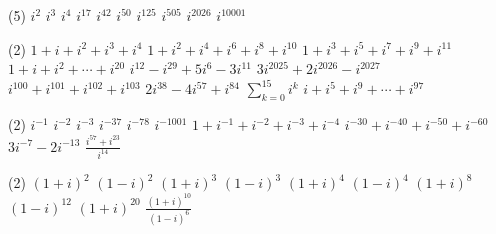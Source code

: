 \documentclass[12pt,a4paper]{article}
\begin{document}
\begin{exercise}[Vypočítejte]
    \begin{tasks}(5)
        \task $i^2$
        \task $i^3$
        \task $i^4$
        \task $i^{17}$
        \task $i^{42}$
        \task $i^{50}$
        \task $i^{125}$
        \task $i^{505}$
        \task $i^{2026}$
        \task $i^{10001}$
    \end{tasks}
\end{exercise}


\begin{exercise}[Vypočítejte]
    \begin{tasks}(2)
        \task $1+i+i^2+i^3+i^4$
        \task $1+i^2+i^4+i^6+i^8+i^{10}$
        \task $1+i^3+i^5+i^7+i^9+i^{11}$
        \task $1+i+i^2+\cdots+i^{20}$
        \task $i^{12}-i^{29}+5i^{6}-3i^{11}$
        \task $3i^{2025}+2i^{2026}-i^{2027}$
        \task $i^{100}+i^{101}+i^{102}+i^{103}$
        \task $2i^{38}-4i^{57}+i^{84}$
        \task $\displaystyle \sum_{k=0}^{15}i^k$
        \task $\displaystyle i+i^5+i^9+\cdots+i^{97}$
    \end{tasks}
\end{exercise}


\begin{exercise}[Vypočítejte]
    \begin{tasks}(2)
        \task $i^{-1}$
        \task $i^{-2}$
        \task $i^{-3}$
        \task $i^{-37}$
        \task $i^{-78}$
        \task $i^{-1001}$
        \task $1+i^{-1}+i^{-2}+i^{-3}+i^{-4}$
        \task $i^{-30}+i^{-40}+i^{-50}+i^{-60}$
        \task $3i^{-7}-2i^{-13}$
        \task $\displaystyle \frac{i^{57}+i^{23}}{i^{14}}$
    \end{tasks}
\end{exercise}


\begin{exercise}[Vypočítejte]
    \begin{tasks}(2)
        \task $(1+i)^2$
        \task $(1-i)^2$
        \task $(1+i)^3$
        \task $(1-i)^3$
        \task $(1+i)^4$
        \task $(1-i)^4$
        \task $(1+i)^8$
        \task $(1-i)^{12}$
        \task $(1+i)^{20}$
        \task $\displaystyle \frac{(1+i)^{10}}{(1-i)^6}$
    \end{tasks}
\end{exercise}
\end{document}
